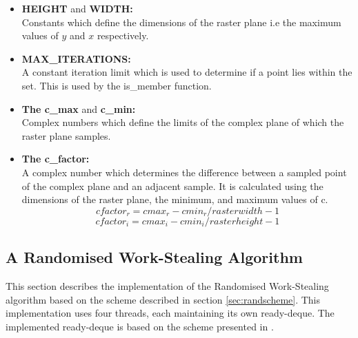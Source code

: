 \begin{itemize}
\item \textbf{HEIGHT} and \textbf{WIDTH:} \\
            Constants which define the dimensions of the raster plane i.e the maximum values of
            \(y\) and \(x\) respectively.
            
            
\item \textbf{MAX\_ITERATIONS:} \\ %
            A constant iteration limit which is used to determine if a point lies within the set.
            This is used by the is\_member function.
            
\item \textbf{The c\_max} and \textbf{c\_min:} \\
            Complex numbers which define the limits of the complex plane of
            which the raster plane samples.

\item \textbf{The c\_factor:} \\
            A complex number which determines the difference between a sampled point 
            of the complex plane and an adjacent sample.
            It is calculated using the dimensions of the raster plane, the 
            minimum, and maximum values of c.
            \[ cfactor_r = cmax_r - cmin_r / rasterwidth - 1 \]
            \[ cfactor_i = cmax_i - cmin_i / rasterheight - 1 \]            
\end{itemize} 

\subsection{A Randomised Work-Stealing Algorithm}
\label{sec:randws}


This section describes the implementation of the Randomised Work-Stealing algorithm based on the scheme described in section \ref{sec:randscheme}.
This implementation uses four threads, each maintaining its own \gls{ready-deque}. The implemented \gls{ready-deque} is based on
the scheme presented in \cite{circdeque}.

